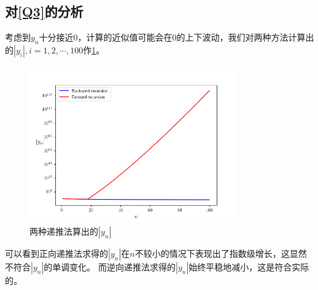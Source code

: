 \documentclass[a4paper,11pt,notitlepage]{article}
\begin{document}
\subsection{对\ref{Q3}的分析}
考虑到$y_{n}$十分接近$0$，计算的近似值可能会在$0$的上下波动，我们对两种方法计算出的$\left|y_{i}\right|,i=1,2,\cdots,100$作\cref{pic:2}。
\begin{figure}[H]
    \centering
    \includegraphics[width=0.8\textwidth]{../picture/Second_Week_2.png}
    \caption{两种递推法算出的$\left|y_{n}\right|$}
    \label{pic:2}
\end{figure}
\indent 可以看到正向递推法求得的$\left|y_{n}\right|$在$n$不较小的情况下表现出了指数级增长，这显然不符合$\left|y_{n}\right|$的单调变化。
而逆向递推法求得的$\left|y_{n}\right|$始终平稳地减小，这是符合实际的。
\end{document}
